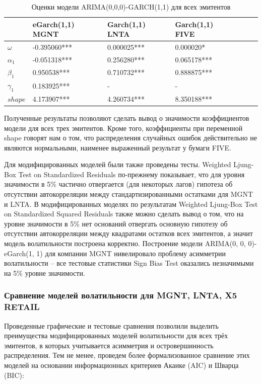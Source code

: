 \documentclass[a4paper,12pt,twoside]{article}
\begin{document}
\begin{table}[!h]
\centering
\begin{tabular}{lllllll}
  \hline
          & eGarch(1,1) MGNT & Garch(1,1) LNTA &  Garch(1,1) FIVE \\
  \hline
  $\omega$ & -0.395060*** &  0.000025*** & 0.000020*  \\
  $\alpha_1$ & -0.051318*** &  0.256280*** & 0.065178*** \\
  $\beta_1$ & 0.950538*** &  0.710732*** & 0.888875*** \\
  $\gamma_1$ & 0.183925*** &  - & - \\
  $shape$ & 4.173907*** &  4.260734*** & 8.350188*** \\
  \hline
\end{tabular}
\caption{Оценки модели ARIMA(0,0,0)-GARCH(1,1) для всех эмитентов}
\end{table}


Полученные результаты позволяют сделать вывод о значимости коэффициентов модели для всех трех эмитентов. Кроме того, коэффициенты при переменной shape говорят нам о том, что распределения случайных ошибок действительно не являются нормальными, наименее выраженный результат у бумаги FIVE.

Для модифицированных моделей были также проведены тесты. Weighted Ljung-Box Test on Standardized Residuals по-прежнему показывает, что для уровня значимости в 5\% частично отвергается (для некоторых лагов) гипотеза об отсутствии автокорреляции между стандартизированными остатками для MGNT и LNTA. В модифицированных моделях по результатам Weighted Ljung-Box Test on Standardized Squared Residuals также можно сделать вывод о том, что на уровне значимости в 5\% нет оснований отвергать основную гипотезу об отсутствии автокорреляции между квадратами остатков всех эмитентов, а значит модель волатильности построена корректно. Построение модели ARIMA(0, 0, 0)-eGarch(1, 1) для компании MGNT нивелировало проблему асимметрии волатильности – все тестовые статистики Sign Bias Test оказались незначимыми на 5\% уровне значимости.

\subsubsection{Сравнение моделей волатильности для MGNT, LNTA, X5 RETAIL}

Проведенные графические и тестовые сравнения позволили выделить преимущества модифицированных моделей волатильности для всех трёх эмитентов, в которых учитывается асимметрия и островершинность распределения.
Тем не менее, проведем более формализованное сравнение этих моделей на основании информационных критериев Акаике (AIC) и Шварца (BIC):
\end{document}
